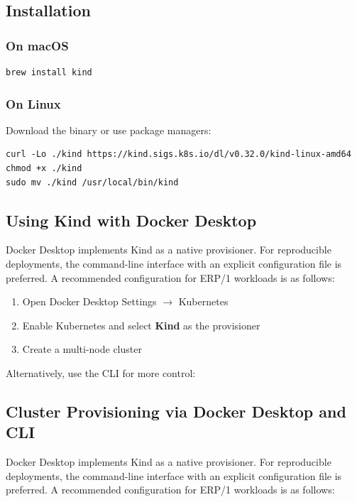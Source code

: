 \documentclass{article}
\begin{document}
\subsection{Installation}

\subsubsection{On macOS}

\begin{verbatim}
brew install kind
\end{verbatim}

\subsubsection{On Linux}

Download the binary or use package managers:

\begin{verbatim}
curl -Lo ./kind https://kind.sigs.k8s.io/dl/v0.32.0/kind-linux-amd64
chmod +x ./kind
sudo mv ./kind /usr/local/bin/kind
\end{verbatim}

\subsection{Using Kind with Docker Desktop}

Docker Desktop implements Kind as a native provisioner.
For reproducible deployments, the command-line interface with an explicit configuration file is preferred.
A recommended configuration for ERP/1 workloads is as follows:

\begin{enumerate}
\item Open Docker Desktop Settings $\rightarrow$ Kubernetes
\item Enable Kubernetes and select \textbf{Kind} as the provisioner
\item Create a multi-node cluster
\end{enumerate}

Alternatively, use the CLI for more control:

\subsection{Cluster Provisioning via Docker Desktop and CLI}

Docker Desktop implements Kind as a native provisioner.
For reproducible deployments, the command-line interface with an explicit configuration file is preferred.
A recommended configuration for ERP/1 workloads is as follows:
\end{document}
